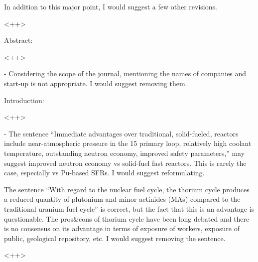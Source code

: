 \documentclass[answers,11pt]{exam}
\begin{document}
\begin{questions}

        \question In addition to this major point, I would suggest a few other 
        revisions.
        \begin{solution}
                <++>
        \end{solution}


        \question Abstract:
        \begin{solution}
                <++>
        \end{solution}

        - Considering the scope of the journal, mentioning the names of 
        companies and start-up is not appropriate. I would suggest removing 
        them.

        \question Introduction:
        \begin{solution}
                <++>
        \end{solution}

        - The sentence ``Immediate advantages over traditional, solid-fueled, 
        reactors include near-atmospheric pressure in the 15 primary loop, 
        relatively high coolant temperature, outstanding neutron economy, 
        improved safety parameters,'' may suggest improved neutron economy vs 
        solid-fuel fast reactors. This is rarely the case, especially vs 
        Pu-based SFRs. I would suggest reformulating.

        \question The sentence ``With regard to the nuclear fuel cycle, the 
        thorium cycle produces a reduced quantity of plutonium and minor 
        actinides (MAs) compared to the traditional uranium fuel cycle'' is 
        correct, but the fact that this is an advantage is questionable. The 
        pros\&cons of thorium cycle have been long debated and there is no 
        consensus on its advantage in terms of exposure of workers, exposure of 
        public, geological repository, etc. I would suggest removing the 
        sentence.
        \begin{solution}
                <++>
        \end{solution}




\end{questions}
\end{document}
